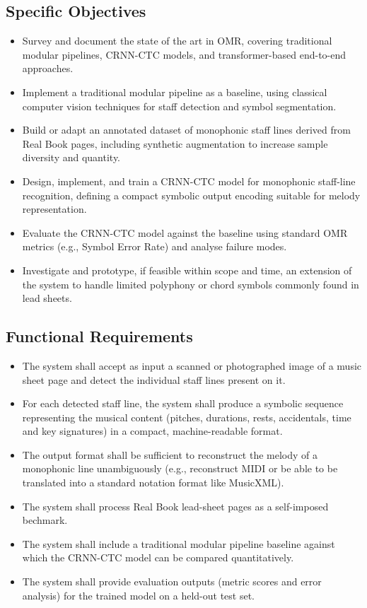 \documentclass[11pt, a4paper]{article}
\begin{document}
\subsection{Specific Objectives}
\begin{itemize}
    \item Survey and document the state of the art in OMR, covering traditional modular pipelines, CRNN-CTC models, and transformer-based end-to-end approaches.
    \item Implement a traditional modular pipeline as a baseline, using classical computer vision techniques for staff detection and symbol segmentation.
    \item Build or adapt an annotated dataset of monophonic staff lines derived from Real Book pages, including synthetic augmentation to increase sample diversity and quantity.
    \item Design, implement, and train a CRNN-CTC model for monophonic staff-line recognition, defining a compact symbolic output encoding suitable for melody representation.
    \item Evaluate the CRNN-CTC model against the baseline using standard OMR metrics (e.g., Symbol Error Rate) and analyse failure modes.
    \item Investigate and prototype, if feasible within scope and time, an extension of the system to handle limited polyphony or chord symbols commonly found in lead sheets.
\end{itemize}    

\subsection{Functional Requirements}
\begin{itemize}
    \item The system shall accept as input a scanned or photographed image of a music sheet page and detect the individual staff lines present on it.
    \item For each detected staff line, the system shall produce a symbolic sequence representing the musical content (pitches, durations, rests, accidentals, time and key signatures) in a compact, machine-readable format.
    \item The output format shall be sufficient to reconstruct the melody of a monophonic line unambiguously (e.g., reconstruct MIDI or be able to be translated into a standard notation format like MusicXML).
    \item The system shall process Real Book lead-sheet pages as a self-imposed bechmark.
    \item The system shall include a traditional modular pipeline baseline against which the CRNN-CTC model can be compared quantitatively.
    \item The system shall provide evaluation outputs (metric scores and error analysis) for the trained model on a held-out test set.
\end{itemize}
\end{document}
